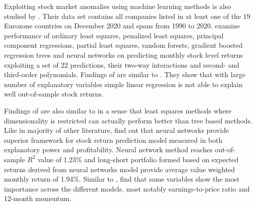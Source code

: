 \documentclass[12pt]{article}
\begin{document}

Exploiting stock market anomalies using machine learning methods is also studied by \citet{Drobetz}. Their data set contains all companies listed in at least one of the 19 Eurozone countries on December 2020 and spans from 1990 to 2020\footnotemark. \citeauthor{Drobetz} examine performance of ordinary least squares, penalized least squares, principal component regressions, partial least squares, random forests, gradient boosted regression trees and neural networks on predicting monthly stock level returns exploiting a set of 22 predictions, their two-way interactions and second- and third-order polynomials. Findings of \citeauthor{Drobetz} are similar to \citet{guetal}. They show that with large number of explanatory variables simple linear regression is not able to explain well out-of-sample stock returns. \par


Findings of \citet{Drobetz} are also similar to \citet{TOBEK2021100588} in a sense that least squares methods where dimensionality is restricted can actually perform better than tree based methods. Like in majority of other literature, \citeauthor{Drobetz} find out that neural networks provide superior framework for stock return prediction model measured in both explanatory power and profitability. Neural network method reaches out-of-sample $R^{2}$ value of 1.23\% and long-short portfolio formed based on expected returns derived from neural networks model provide average value weighted monthly return of 1.94\%. Similar to \citet{guetal}, \citeauthor{Drobetz} find that same variables show the most importance across the different models, most notably earnings-to-price ratio and 12-month momentum. \par
\end{document}
